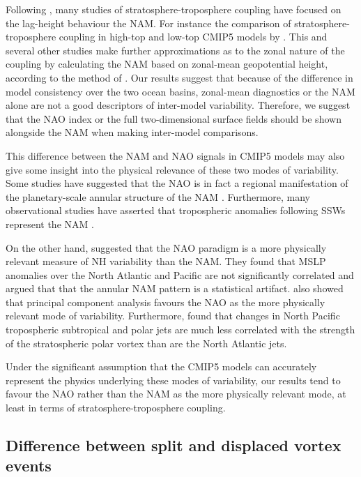 Following \citet{Baldwin2001a}, many studies of stratosphere-troposphere
coupling have focused on the lag-height behaviour the NAM. For instance the
comparison of stratosphere-troposphere coupling in high-top and low-top CMIP5
models by \citet{Charlton-Perez2013}. This and several other studies make
further approximations as to the zonal nature of the coupling by calculating the
NAM based on zonal-mean geopotential height, according to the method of
\citet{Baldwin2009}. Our results suggest that because of the difference in model
consistency over the two ocean basins, zonal-mean diagnostics or the NAM alone
are not a good descriptors of inter-model variability. Therefore, we suggest
that the NAO index or the full two-dimensional surface fields should be shown
alongside the NAM when making inter-model comparisons.

This difference between the NAM and NAO signals in CMIP5 models may also give
some insight into the physical relevance of these two modes of variability. Some
studies have suggested that the NAO is in fact a regional manifestation of the
planetary-scale annular structure of the NAM \citep[e.g.,][]{Thompson1998,
  Wallace2002}. Furthermore, many observational studies have asserted that
tropospheric anomalies following SSWs represent the NAM
\citep[e.g.,][]{Baldwin1999,Baldwin2001a,Thompson2000}. 

On the other hand, \citet{Ambaum2001} suggested that the NAO paradigm is a more
physically relevant measure of NH variability than the NAM. They found that MSLP
anomalies over the North Atlantic and Pacific are not significantly correlated
and argued that that the annular NAM pattern is a statistical
artifact. \citet{Huth2006} also showed that principal component analysis favours
the NAO as the more physically relevant mode of variability. Furthermore,
\citet{Ambaum2002} found that changes in North Pacific tropospheric subtropical
and polar jets are much less correlated with the strength of the stratospheric
polar vortex than are the North Atlantic jets.

Under the significant assumption that the CMIP5 models can accurately represent
the physics underlying these modes of variability, our results tend to favour
the NAO rather than the NAM as the more physically relevant mode, at least in
terms of stratosphere-troposphere coupling. 





\subsection{Difference between split and displaced vortex events}
\label{sec:cmip5_discuss_split_displ}

